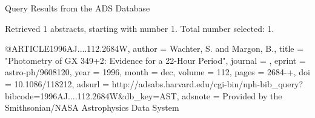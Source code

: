 Query Results from the ADS Database


Retrieved 1 abstracts, starting with number 1.  Total number selected: 1.

@ARTICLE{1996AJ....112.2684W,
   author = {{Wachter}, S. and {Margon}, B.},
    title = "{Photometry of GX 349+2: Evidence for a 22-Hour Period}",
  journal = {\aj},
   eprint = {astro-ph/9608120},
     year = 1996,
    month = dec,
   volume = 112,
    pages = {2684-+},
      doi = {10.1086/118212},
   adsurl = {http://adsabs.harvard.edu/cgi-bin/nph-bib_query?bibcode=1996AJ....112.2684W&db_key=AST},
  adsnote = {Provided by the Smithsonian/NASA Astrophysics Data System}
}


